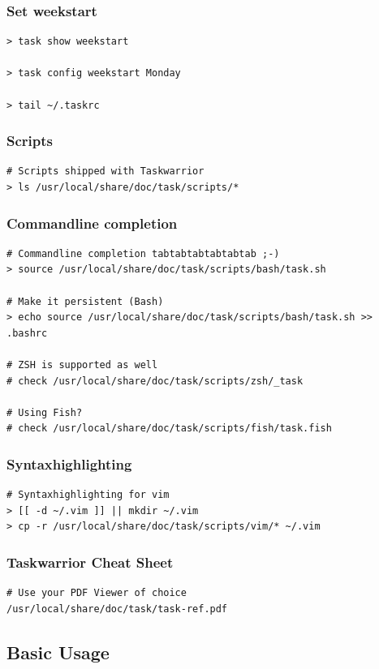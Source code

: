 \documentclass[t,handout,aspectratio=169]{beamer}
\begin{document}
\begin{frame}[fragile]\frametitle{Set weekstart}
    \vfill
    \begin{lstlisting}
> task show weekstart

> task config weekstart Monday

> tail ~/.taskrc\end{lstlisting}
\end{frame}

\begin{frame}[fragile]\frametitle{Scripts}
    \vfill
    \begin{lstlisting}
# Scripts shipped with Taskwarrior
> ls /usr/local/share/doc/task/scripts/*\end{lstlisting}
\end{frame}

\begin{frame}[fragile]\frametitle{Commandline completion}
    \vfill
    \begin{lstlisting}
# Commandline completion tabtabtabtabtabtab ;-)
> source /usr/local/share/doc/task/scripts/bash/task.sh

# Make it persistent (Bash)
> echo source /usr/local/share/doc/task/scripts/bash/task.sh >> .bashrc

# ZSH is supported as well
# check /usr/local/share/doc/task/scripts/zsh/_task

# Using Fish?
# check /usr/local/share/doc/task/scripts/fish/task.fish\end{lstlisting}
\end{frame}

\begin{frame}[fragile]\frametitle{Syntaxhighlighting}
    \vfill
    \begin{lstlisting}
# Syntaxhighlighting for vim
> [[ -d ~/.vim ]] || mkdir ~/.vim
> cp -r /usr/local/share/doc/task/scripts/vim/* ~/.vim\end{lstlisting}
\end{frame}

\begin{frame}[fragile]\frametitle{Taskwarrior Cheat Sheet}
    \vfill
    \begin{lstlisting}
# Use your PDF Viewer of choice
/usr/local/share/doc/task/task-ref.pdf\end{lstlisting}
\end{frame}

\subsection{Basic Usage}
\end{document}

